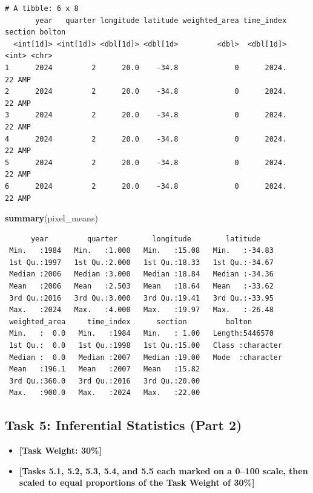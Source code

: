 \documentclass[
  british,
  10pt,
]{article}
\newenvironment{Shaded}{\begin{snugshade}}{\end{snugshade}}
\newcommand{\FunctionTok}[1]{\textcolor[rgb]{0.13,0.29,0.53}{\textbf{#1}}}
\newcommand{\NormalTok}[1]{#1}
\providecommand{\tightlist}{%
  \setlength{\itemsep}{0pt}\setlength{\parskip}{0pt}}
\begin{document}
\begin{verbatim}
# A tibble: 6 x 8
       year   quarter longitude latitude weighted_area time_index section bolton
  <int[1d]> <int[1d]> <dbl[1d]> <dbl[1d>         <dbl>  <dbl[1d]>   <int> <chr> 
1      2024         2      20.0    -34.8             0      2024.      22 AMP   
2      2024         2      20.0    -34.8             0      2024.      22 AMP   
3      2024         2      20.0    -34.8             0      2024.      22 AMP   
4      2024         2      20.0    -34.8             0      2024.      22 AMP   
5      2024         2      20.0    -34.8             0      2024.      22 AMP   
6      2024         2      20.0    -34.8             0      2024.      22 AMP   
\end{verbatim}

\begin{Shaded}
\begin{Highlighting}[]
\FunctionTok{summary}\NormalTok{(pixel\_means)}
\end{Highlighting}
\end{Shaded}

\begin{verbatim}
      year         quarter        longitude        latitude     
 Min.   :1984   Min.   :1.000   Min.   :15.08   Min.   :-34.83  
 1st Qu.:1997   1st Qu.:2.000   1st Qu.:18.33   1st Qu.:-34.67  
 Median :2006   Median :3.000   Median :18.84   Median :-34.36  
 Mean   :2006   Mean   :2.503   Mean   :18.64   Mean   :-33.62  
 3rd Qu.:2016   3rd Qu.:3.000   3rd Qu.:19.41   3rd Qu.:-33.95  
 Max.   :2024   Max.   :4.000   Max.   :19.97   Max.   :-26.48  
 weighted_area     time_index      section         bolton         
 Min.   :  0.0   Min.   :1984   Min.   : 1.00   Length:5446570    
 1st Qu.:  0.0   1st Qu.:1998   1st Qu.:15.00   Class :character  
 Median :  0.0   Median :2007   Median :19.00   Mode  :character  
 Mean   :196.1   Mean   :2007   Mean   :15.82                     
 3rd Qu.:360.0   3rd Qu.:2016   3rd Qu.:20.00                     
 Max.   :900.0   Max.   :2024   Max.   :22.00                     
\end{verbatim}

\subsection{Task 5: Inferential Statistics (Part
2)}\label{task-5-inferential-statistics-part-2}

\begin{itemize}
\tightlist
\item
  \textbf{{[}Task Weight: 30\%{]}}
\item
  \textbf{{[}Tasks 5.1, 5.2, 5.3, 5.4, and 5.5 each marked on a 0--100
  scale, then scaled to equal proportions of the Task Weight of 30\%{]}}
\end{itemize}
\end{document}
